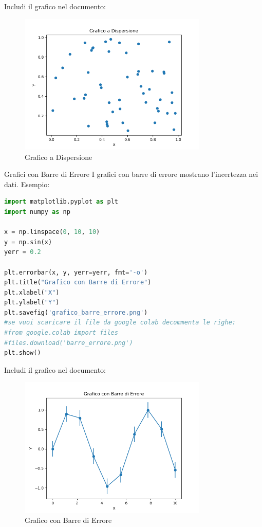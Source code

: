 \documentclass[12pt,a4paper,oneside]{book}
\makeatletter
\renewcommand{\subsection}{\@startsection {subsection}{2}{\z@}
{-3ex \@plus -0.1ex \@minus -.4ex}
{0.5ex \@plus.2ex }
{\color[rgb]{0.141,0.596,0.749}\normalfont\sffamily\bfseries}}
\theoremstyle{esercizio}
\makeatother
\begin{document}
Includi il grafico nel documento:
\begin{figure}[h!]
    \centering
    \includegraphics[width=0.8\textwidth]{img/grafico_dispersione.png}
    \caption{Grafico a Dispersione}
    \label{fig:grafico_dispersione}
\end{figure}

\subsection{Grafici con Barre di Errore}
I grafici con barre di errore mostrano l'incertezza nei dati. Esempio:
\begin{lstlisting}[language=Python]
import matplotlib.pyplot as plt
import numpy as np

x = np.linspace(0, 10, 10)
y = np.sin(x)
yerr = 0.2

plt.errorbar(x, y, yerr=yerr, fmt='-o')
plt.title("Grafico con Barre di Errore")
plt.xlabel("X")
plt.ylabel("Y")
plt.savefig('grafico_barre_errore.png')
#se vuoi scaricare il file da google colab decommenta le righe:
#from google.colab import files
#files.download('barre_errore.png')
plt.show()
\end{lstlisting}

Includi il grafico nel documento:
\begin{figure}[h!]
    \centering
    \includegraphics[width=0.8\textwidth]{img/grafico_barre_errore.png}
    \caption{Grafico con Barre di Errore}
    \label{fig:barre_errore}
\end{figure}
\end{document}
